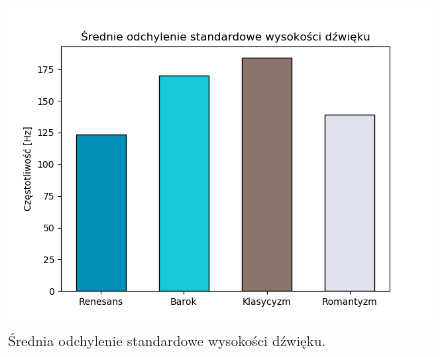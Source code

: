 \documentclass[printmode, eng, openany]{mgr}
\begin{document}
\begin{figure}[H]
\centering
\includegraphics[scale=0.75]{plots/avg_pitch_std.png}
\caption{Średnia odchylenie standardowe wysokości dźwięku.}
\end{figure}
\end{document}
